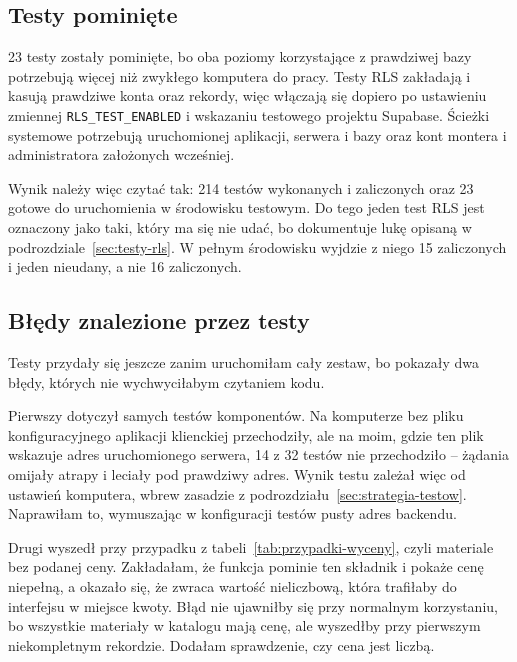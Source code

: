 \subsection{Testy pominięte}
\label{ssec:przypadki-niewykonane}

23 testy zostały pominięte, bo oba poziomy korzystające z prawdziwej bazy potrzebują więcej niż zwykłego komputera do pracy. Testy RLS zakładają i kasują prawdziwe konta oraz rekordy, więc włączają się dopiero po ustawieniu zmiennej \texttt{RLS\_TEST\_ENABLED} i wskazaniu testowego projektu Supabase. Ścieżki systemowe potrzebują uruchomionej aplikacji, serwera i bazy oraz kont montera i administratora założonych wcześniej.

Wynik należy więc czytać tak: 214 testów wykonanych i zaliczonych oraz 23 gotowe do uruchomienia w środowisku testowym. Do tego jeden test RLS jest oznaczony jako taki, który ma się nie udać, bo dokumentuje lukę opisaną w podrozdziale~\ref{sec:testy-rls}. W pełnym środowisku wyjdzie z niego 15 zaliczonych i jeden nieudany, a nie 16 zaliczonych.

\subsection{Błędy znalezione przez testy}
\label{ssec:usterki}

Testy przydały się jeszcze zanim uruchomiłam cały zestaw, bo pokazały dwa błędy, których nie wychwyciłabym czytaniem kodu.

Pierwszy dotyczył samych testów komponentów. Na komputerze bez pliku konfiguracyjnego aplikacji klienckiej przechodziły, ale na moim, gdzie ten plik wskazuje adres uruchomionego serwera, 14 z 32 testów nie przechodziło -- żądania omijały atrapy i leciały pod prawdziwy adres. Wynik testu zależał więc od ustawień komputera, wbrew zasadzie z podrozdziału~\ref{sec:strategia-testow}. Naprawiłam to, wymuszając w konfiguracji testów pusty adres backendu.

Drugi wyszedł przy przypadku z tabeli~\ref{tab:przypadki-wyceny}, czyli materiale bez podanej ceny. Zakładałam, że funkcja pominie ten składnik i pokaże cenę niepełną, a okazało się, że zwraca wartość nieliczbową, która trafiłaby do interfejsu w miejsce kwoty. Błąd nie ujawniłby się przy normalnym korzystaniu, bo wszystkie materiały w katalogu mają cenę, ale wyszedłby przy pierwszym niekompletnym rekordzie. Dodałam sprawdzenie, czy cena jest liczbą.
